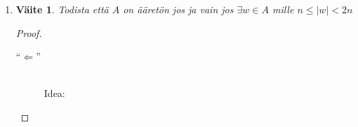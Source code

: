 \documentclass[a4paper,11pt,draft]{article}
\newtheorem*{claim}{Väite}
\begin{document}
\begin{enumerate}
\begin{enumerate}
\begin{proof}
\begin{description}
\begin{enumerate}
            Erityisesti
            \begin{alignat*}{3}
              & \delta(q_{i-1}, w_{i-1}) && = q_i && = q_j \\
              \textrm{ja}\quad & \delta(q_i, u_j) && = \delta(q_j, u_j) && = q_{j+1}
            \end{alignat*}
            Tällöin merkkijono
            \begin{equation*}
              v = w_1 \ldots w_{i-1}w_j \ldots w_k
            \end{equation*}
            kulkee tilajonon
            \begin{equation*}
              \bar{p} = q_1 \ldots q_iq_{j+1} \ldots q_{k+1}
            \end{equation*}
            läpi. Koska tilajonoissa $\bar{q}$ ja $\bar{p}$ on sama
            viimeinen tila $q_{k+1} \in F$, hyväksyy automaatti $M$
            myös merkkijonon $v$. Lisäksi $|v| \le |u| - 1$, eli
            merkkinono lyhenee ainakin yhden merkin verran.
            Toistamalla tätä menetelmää korkeintaan $(k - n) + 1$
            kertaa, löydetään automaatin $M$ hyväksymä merkkijono $u$,
            jolla merkkijono lyhenee ainakin $(k - n) + 1$ merkin
            verran.
            \begin{align*}
              |u| &\le |u| - ((k - n) + 1) \\
              &= k - k + n -1 \\
              &= n - 1 \\ 
              &< n
            \end{align*}
            Siis $|u| < n$ ja täten merkkijono $u$ toteuttaa halutun
            ehdon.
          \end{enumerate}
      \end{description}
    \end{proof}
  \item
    \begin{claim}
      Todista että $A$ on ääretön jos ja vain jos $\exists w \in A$
      mille $n \le |w| < 2n$
    \end{claim}
    \begin{proof} \hfill \\
      \begin{description}
        \item[``$\Leftarrow$''] \hfill \\
          Idea:

\end{description}
\end{proof}
\end{enumerate}
\end{enumerate}
\end{document}

